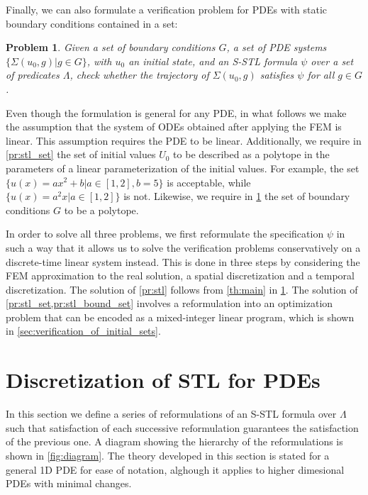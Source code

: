 \documentclass[letterpaper, 10 pt, conference]{ieeeconf/ieeeconf}
\newtheorem{problem}{Problem}
\begin{document}
Finally, we can also formulate a verification problem for PDEs with static
boundary conditions contained in a set:

\begin{problem}
\label{pr:stl_bound_set}
    Given a set of boundary conditions $G$, a set of PDE systems
    $\{\Sigma(u_0, g) | g \in G\}$, with $u_0$
    an initial state, and an S-STL formula $\psi$ over a set of
    predicates $\Lambda$, check whether the trajectory of $\Sigma(u_0, g)$
    satisfies $\psi$ for all $g \in G$.
\end{problem}

Even though the formulation is general for any PDE, in what follows we make the
assumption that the system of ODEs obtained after applying the FEM is linear.
This assumption requires the PDE
to be linear. Additionally, we require in \cref{pr:stl_set} the set of initial
values $U_0$ to be described as a polytope in the parameters of a
linear parameterization of the initial values. For example, the set $\{u(x)
= a x^2 + b | a \in [1,2], b = 5\}$ is acceptable, while $\{u(x) = a^2 x |
a \in [1,2]\}$ is not. Likewise, we require in \cref{pr:stl_bound_set} the set
of boundary conditions $G$ to be a polytope.

In order to solve all three problems, we first reformulate the specification $\psi$
in such a way that it allows us to solve the verification problems
conservatively on a discrete-time linear system instead. This is done in three
steps by considering the FEM approximation to the real solution, a spatial
discretization and a temporal discretization. The solution of \cref{pr:stl}
follows from \cref{th:main} in
\cref{sec:formally_correct_discretization_of_pdestl}. The solution of
\cref{pr:stl_set,pr:stl_bound_set}
involves a reformulation into an optimization problem that can be encoded as a
mixed-integer linear program, which is shown in
\cref{sec:verification_of_initial_sets}.

\section{Discretization of STL for PDEs}
\label{sec:formally_correct_discretization_of_pdestl}

In this section we define a series of reformulations of an S-STL formula over
$\Lambda$ such that satisfaction of each successive reformulation guarantees the
satisfaction of the previous one. A diagram showing the hierarchy of the
reformulations is shown in \cref{fig:diagram}. The theory developed in this section is stated
for a general 1D PDE for ease of notation, alghough it applies to higher dimesional PDEs
with minimal changes.
\end{document}
